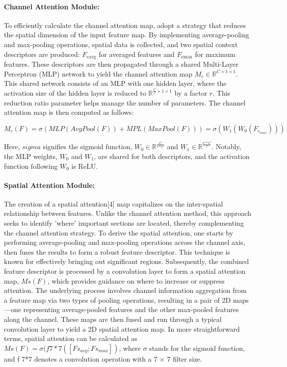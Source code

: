\paragraph{Channel Attention Module:}
To efficiently calculate the channel attention map, \cite{woo2018cbam} adopt a strategy that reduces the spatial dimension of the input feature map. By implementing average-pooling and max-pooling operations, spatial data is collected, and two spatial context descriptors are produced: \(F_{\text{cavg}}\) for averaged features and \(F_{\text{cmax}}\) for maximum features. These descriptors are then propagated through a shared Multi-Layer Perceptron (MLP) network to yield the channel attention map \(M_c \in \mathbb{R}^{C \times 1 \times 1}\). This shared network consists of an MLP with one hidden layer, where the activation size of the hidden layer is reduced to \(\mathbb{R}^{\frac{C}{r} \times 1 \times 1}\) by a factor \(r\). This reduction ratio parameter helps manage the number of parameters. The channel attention map is then computed as follows:

\begin{equation}
    M_{c}(F)=\sigma(MLP(AvgPool(F))+MPL(MaxPool(F))) = \sigma(W_{1}(W_{0}(F_{c_{max}})))
\end{equation}

Here, \(sigma\) signifies the sigmoid function, \(W_{0} \in \mathbb{R}^{\frac{C}{r*C}}\) and \(W_{1} \in \mathbb{R}^{\frac{C*C}{r}}\). Notably, the MLP weights, \(W_0\) and \(W_1\), are shared for both descriptors, and the activation function following \(W_0\) is ReLU.

\paragraph{Spatial Attention Module:}
The creation of a spatial attention[4] map capitalizes on the inter-spatial relationship between features. Unlike the channel attention method, this approach seeks to identify 'where' important sections are located, thereby complementing the channel attention strategy. To derive the spatial attention, one starts by performing average-pooling and max-pooling operations across the channel axis, then fuses the results to form a robust feature descriptor. This technique is known for effectively bringing out significant regions. Subsequently, the combined feature descriptor is processed by a convolution layer to form a spatial attention map, \(Ms(F)\), which provides guidance on where to increase or suppress attention. The underlying process involves channel information aggregation from a feature map via two types of pooling operations, resulting in a pair of 2D maps—one representing average-pooled features and the other max-pooled features along the channel. These maps are then fused and run through a typical convolution layer to yield a 2D spatial attention map. In more straightforward terms, spatial attention can be calculated as \(Ms(F) = \sigma(f7*7([Fs_{avg}; Fs_{max}])\), where \(\sigma\) stands for the sigmoid function, and f 7*7 denotes a convolution operation with a 7 × 7 filter size.

